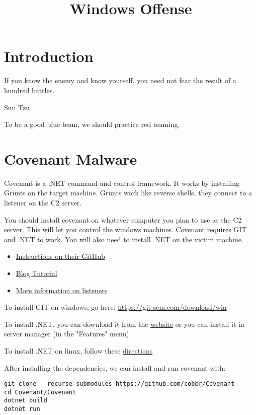 \documentclass{article}
\begin{document}
\graphicspath{ {./Images/} }

\title{Windows Offense}

\tableofcontents

\section{Introduction}
\epigraph{If you know the enemy and know yourself, you need not fear the result of a hundred battles.}{Sun Tzu}

To be a good blue team, we should practice red teaming.

\section{Covenant Malware}
Covenant is a .NET command and control framework. It works by installing
Grunts on the target machine. Grunts work like reverse shells, they connect to a listener on 
the C2 server.

You should install covenant on whatever computer you
plan to use as the C2 server. This will let you control the windows machines. 
Covenant requires GIT and .NET to work. 
You will also need to install .NET on the victim machine.

\begin{itemize}
        \item\href{https://github.com/cobbr/Covenant/wiki/Installation-And-Startup}{Instructions on their GitHub}
        \item \href{https://blog.netwrix.com/2022/12/16/covenant-c2-tutorial/}{Blog Tutorial}
        \item \href{https://github.com/cobbr/Covenant-wiki/blob/master/Listeners.md}{More information on listeners}
\end{itemize}

To install GIT on windows, go here:
\href{https://git-scm.com/download/win}{https://git-scm.com/download/win}

To install .NET, you can download it from the
\href{https://dotnet.microsoft.com/en-us/download}{website} or you can install it in server manager (in the "Features" menu).

To install .NET on linux, follow these 
\href{https://learn.microsoft.com/en-us/dotnet/core/install/linux-scripted-manual#scripted-install}{directions}


After installing the dependencies, we can install and run covenant with:

\begin{lstlisting}
git clone --recurse-submodules https://github.com/cobbr/Covenant
cd Covenant/Covenant
dotnet build
dotnet run
\end{lstlisting}
\end{document}
